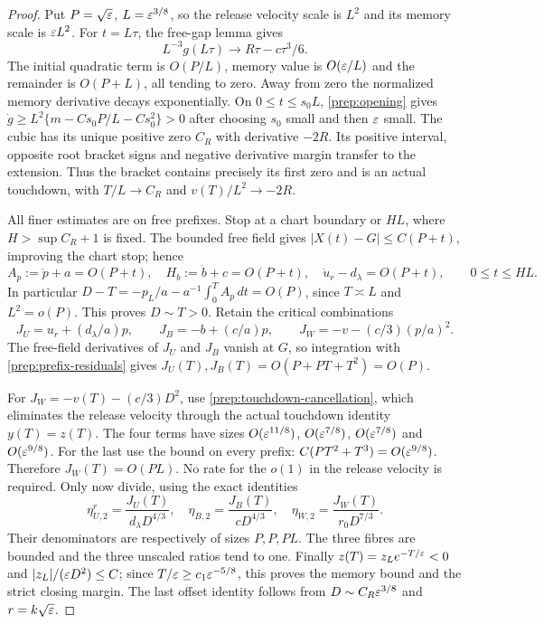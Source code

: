 \begin{proof}
Put $P=\sqrt{\varepsilon}$, $L=\varepsilon^{3/8}$, so the release velocity scale
is $L^2$ and its memory scale is $\varepsilon L^2$. For $t=L\tau$,
the free-gap lemma gives
\[
 L^{-3}g(L\tau)\longrightarrow R\tau-c\tau^3/6.
\]
The initial quadratic term is $O(P/L)$, memory value is
$O(\varepsilon/L)$ and the remainder is $O(P+L)$, all tending to zero.
Away from zero the normalized memory derivative decays exponentially.
On $0\le t\le s_0L$, \eqref{prep:opening} gives
$\dot g\ge L^2\{m-Cs_0P/L-Cs_0^2\}>0$ after choosing $s_0$
small and then $\varepsilon$ small. The cubic has its unique positive zero
$C_R$ with derivative $-2R$. Its positive interval, opposite root
bracket signs and negative derivative margin transfer to the extension.
Thus the bracket contains precisely its first zero and is an actual
touchdown, with $T/L\to C_R$ and $v(T)/L^2\to-2R$.

All finer estimates are on free prefixes. Stop at a chart boundary
or $HL$, where $H>\sup C_R+1$ is fixed. The bounded free field
gives $|X(t)-G|\le C(P+t)$, improving the chart stop; hence
\begin{equation}
 A_p:=\dot p+a=O(P+t),\quad H_b:=\dot b+c=O(P+t),\quad
 \dot u_r-d_\lambda=O(P+t),\qquad 0\le t\le HL.
 \label{prep:prefix-residuals}
\end{equation}
In particular $D-T=-p_L/a-a^{-1}\int_0^TA_p\,dt=O(P)$, since
$T\asymp L$ and $L^2=o(P)$. This proves $D\sim T>0$.
Retain the critical combinations
\begin{equation}
 J_U=u_r+(d_\lambda/a)p,\qquad J_B=-b+(c/a)p,\qquad
 J_W=-v-(c/3)(p/a)^2.
 \label{prep:critical-combinations}
\end{equation}
The free-field derivatives of $J_U$ and $J_B$ vanish at $G$, so integration with
\eqref{prep:prefix-residuals} gives
$J_U(T),J_B(T)=O(P+PT+T^2)=O(P)$.

For $J_W=-v(T)-(c/3)D^2$, use
\eqref{prep:touchdown-cancellation}, which eliminates the release
velocity through the actual touchdown identity $y(T)=z(T)$.
The four terms have sizes $O(\varepsilon^{11/8})$,
$O(\varepsilon^{7/8})$, $O(\varepsilon^{7/8})$ and $O(\varepsilon^{9/8})$.
For the last use the bound on every prefix:
$C(PT^2+T^3)=O(\varepsilon^{9/8})$. Therefore $J_W(T)=O(PL)$.
No rate for the $o(1)$ in the release velocity is required.
Only now divide, using the exact identities
\[
 \eta_{U,2}^r=\frac{J_U(T)}{d_\lambda D^{4/3}},\quad
 \eta_{B,2}=\frac{J_B(T)}{cD^{4/3}},\quad
 \eta_{W,2}=\frac{J_W(T)}{r_0D^{7/3}}.
\]
Their denominators are respectively of sizes $P,P,PL$.
The three fibres are bounded and the three unscaled ratios tend to
one. Finally $z(T)=z_Le^{-T/\varepsilon}<0$ and
$|z_L|/(\varepsilon D^2)\le C$; since
$T/\varepsilon\ge c_1\varepsilon^{-5/8}$, this proves the memory bound and
the strict closing margin. The last offset identity follows from
$D\sim C_R\varepsilon^{3/8}$ and $r=k\sqrt{\varepsilon}$.
\end{proof}

